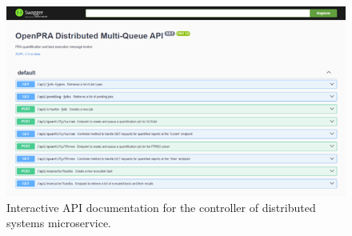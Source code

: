 \begin{landscape}
\begin{figure}
    \centering
    \includegraphics[width=1.3\textwidth]{4_proposed_solution/web_app/figures/swagger_doc.png}
    \caption{Interactive API documentation for the controller of distributed systems microservice.}
    \label{fig:swagger_doc}
\end{figure}
\end{landscape}